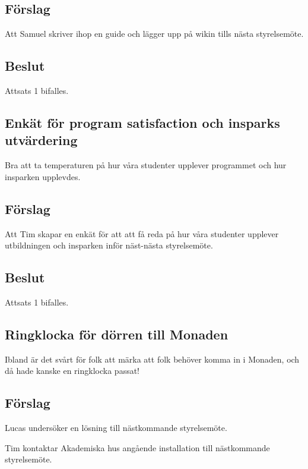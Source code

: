 \documentclass[protokoll]{dvd}
\begin{document}
\subsection{Förslag}
\begin{attsatser}
    \item Att Samuel skriver ihop en guide och lägger upp på wikin tills nästa styrelsemöte.
\end{attsatser}
\subsection{Beslut}
Attsats 1 bifalles.

\subsection*{Enkät för program satisfaction och insparks utvärdering}
Bra att ta temperaturen på hur våra studenter upplever programmet och hur insparken upplevdes.

\subsection{Förslag}
\begin{attsatser}
    \item Att Tim skapar en enkät för att att få reda på hur våra studenter upplever utbildningen och insparken inför näst-nästa styrelsemöte.
\end{attsatser}
\subsection{Beslut}
Attsats 1 bifalles.

\subsection*{Ringklocka för dörren till Monaden}
Ibland är det svårt för folk att märka att folk behöver komma in i Monaden, och då hade kanske en ringklocka passat!
\subsection{Förslag}
\begin{attsatser}
    \item Lucas undersöker en lösning till nästkommande styrelsemöte.
    \item Tim kontaktar Akademiska hus angående installation till nästkommande styrelsemöte.
\end{attsatser}
\end{document}
